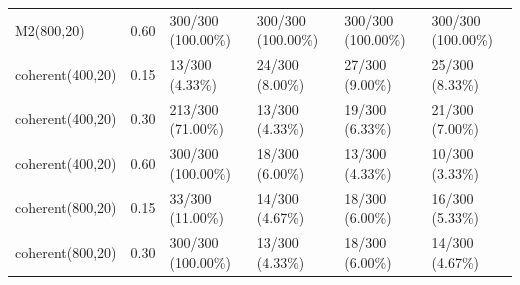 \begin{longtable}{p{27mm}p{9mm}p{29mm}p{29mm}p{29mm}p{29mm}}
M2\newline (800,20) & 0.60 & 300/300 (100.00\%)\newline [98.78, 100.00] & 300/300 (100.00\%)\newline [98.78, 100.00] & 300/300 (100.00\%)\newline [98.78, 100.00] & 300/300 (100.00\%)\newline [98.78, 100.00] \\
coherent\newline (400,20) & 0.15 & 13/300 (4.33\%)\newline [2.33, 7.30] & 24/300 (8.00\%)\newline [5.19, 11.67] & 27/300 (9.00\%)\newline [6.01, 12.82] & 25/300 (8.33\%)\newline [5.47, 12.06] \\
coherent\newline (400,20) & 0.30 & 213/300 (71.00\%)\newline [65.51, 76.07] & 13/300 (4.33\%)\newline [2.33, 7.30] & 19/300 (6.33\%)\newline [3.86, 9.71] & 21/300 (7.00\%)\newline [4.39, 10.50] \\
coherent\newline (400,20) & 0.60 & 300/300 (100.00\%)\newline [98.78, 100.00] & 18/300 (6.00\%)\newline [3.59, 9.32] & 13/300 (4.33\%)\newline [2.33, 7.30] & 10/300 (3.33\%)\newline [1.61, 6.04] \\
coherent\newline (800,20) & 0.15 & 33/300 (11.00\%)\newline [7.69, 15.10] & 14/300 (4.67\%)\newline [2.57, 7.71] & 18/300 (6.00\%)\newline [3.59, 9.32] & 16/300 (5.33\%)\newline [3.08, 8.52] \\
coherent\newline (800,20) & 0.30 & 300/300 (100.00\%)\newline [98.78, 100.00] & 13/300 (4.33\%)\newline [2.33, 7.30] & 18/300 (6.00\%)\newline [3.59, 9.32] & 14/300 (4.67\%)\newline [2.57, 7.71] \\

\end{longtable}
